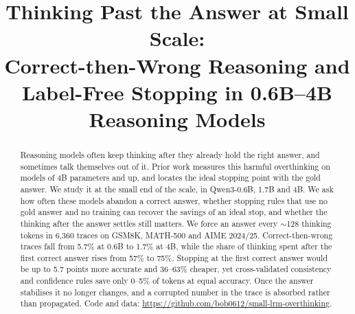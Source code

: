 \documentclass[conference]{IEEEtran}
\newcommand{\repo}{\url{https://github.com/bob0612/small-lrm-overthinking}}
\begin{document}
\title{Thinking Past the Answer at Small Scale:\\Correct-then-Wrong Reasoning and Label-Free Stopping in 0.6B--4B Reasoning Models}
\author{}
\maketitle

\begin{abstract}
Reasoning models often keep thinking after they already hold the right answer, and sometimes talk themselves out of it.
Prior work measures this harmful overthinking on models of 4B parameters and up, and locates the ideal stopping point
with the gold answer. We study it at the small end of the scale, in Qwen3-0.6B, 1.7B and 4B. We ask how often these
models abandon a correct answer, whether stopping rules that use no gold answer and no training can recover the savings
of an ideal stop, and whether the thinking after the answer settles still matters. We force an answer every
$\sim$128 thinking tokens in 6{,}360 traces on GSM8K, MATH-500 and AIME 2024/25. Correct-then-wrong traces fall from
5.7\% at 0.6B to 1.7\% at 4B, while the share of thinking spent after the first correct answer rises from 57\% to
75\%. Stopping at the first correct answer would be up to 5.7 points more accurate and 36--63\% cheaper, yet
cross-validated consistency and confidence rules save only 0--5\% of tokens at equal accuracy. Once the answer
stabilises it no longer changes, and a corrupted number in the trace is absorbed rather than propagated. Code and data:
\repo.
\end{abstract}
\end{document}
